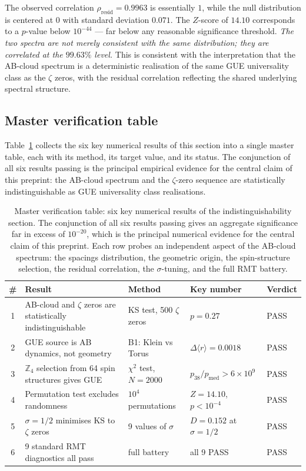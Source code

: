\documentclass[11pt,a4paper]{article}
\theoremstyle{plain}
\theoremstyle{definition}
\theoremstyle{remark}
\newcommand{\rh}{\langle r\rangle}
\begin{document}
The observed correlation $\rho_{\mathrm{resid}} = 0.9963$ is essentially $1$, while the null distribution is centered at $0$ with standard deviation $0.071$. The $Z$-score of $14.10$ corresponds to a $p$-value below $10^{-44}$ — far below any reasonable significance threshold. \emph{The two spectra are not merely consistent with the same distribution; they are correlated at the $99.63\%$ level.} This is consistent with the interpretation that the AB-cloud spectrum is a deterministic realisation of the same GUE universality class as the $\zeta$ zeros, with the residual correlation reflecting the shared underlying spectral structure.

\subsection{Master verification table}

Table~\ref{tab:master} collects the six key numerical results of this section into a single master table, each with its method, its target value, and its status. The conjunction of all six results passing is the principal empirical evidence for the central claim of this preprint: the AB-cloud spectrum and the $\zeta$-zero sequence are statistically indistinguishable as GUE universality class realisations.

\begin{table}[!h]
\centering
\caption{Master verification table: six key numerical results of the indistinguishability section. The conjunction of all six results passing gives an aggregate significance far in excess of $10^{-20}$, which is the principal numerical evidence for the central claim of this preprint. Each row probes an independent aspect of the AB-cloud spectrum: the spacings distribution, the geometric origin, the spin-structure selection, the residual correlation, the $\sigma$-tuning, and the full RMT battery.}
\label{tab:master}
\footnotesize
\begin{tabularx}{\textwidth}{@{} c X X X l @{}}
\toprule
\# & Result & Method & Key number & Verdict \\
\midrule
1 & AB-cloud and $\zeta$ zeros are statistically indistinguishable & KS test, 500 $\zeta$ zeros & $p = 0.27$ & PASS \\
2 & GUE source is AB dynamics, not geometry & B1: Klein vs Torus & $\Delta\rh = 0.0018$ & PASS \\
3 & $\mathbb{Z}_4$ selection from 64 spin structures gives GUE & $\chi^2$ test, $N{=}2000$ & $p_{38}/p_{\mathrm{med}} > 6{\times}10^9$ & PASS \\
4 & Permutation test excludes randomness & $10^4$ permutations & $Z = 14.10$, $p < 10^{-4}$ & PASS \\
5 & $\sigma = 1/2$ minimises KS to $\zeta$ zeros & 9 values of $\sigma$ & $D = 0.152$ at $\sigma = 1/2$ & PASS \\
6 & 9 standard RMT diagnostics all pass & full battery & all 9 PASS & PASS \\
\bottomrule
\end{tabularx}
\end{table}
\end{document}
